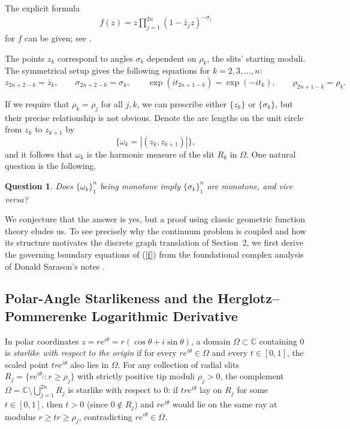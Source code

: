 \documentclass[11pt,reqno]{amsart}
\newtheorem{ques}[thm]{Question}
\numberwithin{equation}{section}
\newcommand{\C}{\mathbb{C}}
\begin{document}
The explicit formula
\begin{align} \label{f}
  f(z) = z \prod_{j=1}^{2n}(1-\bar{z}_jz)^{-\sigma_j}
\end{align}
for $f$ can be given; see \cite[Thm 3.18]{Pom}.

The points $z_k$ correspond to angles $\sigma_k$ dependent on $\rho_k$, the slits' starting moduli.
The symmetrical setup gives the following equations for $k = 2, 3, \dots, n$:
$$z_{2n+2-k} = \bar{z}_k, \qquad \sigma_{2n+2-k} = \sigma_k, \qquad \exp(it_{2n+1-k}) = \exp(-it_k), \qquad \rho_{2n+1-k} = \rho_k.$$

If we require that $\rho_k = \rho_j$ for all $j,k$, we can prescribe either $\{z_k\}$ or $\{\sigma_k\}$, but their precise relationship is not obvious. Denote the arc lengths on the unit circle from $z_k$ to $z_{k+1}$ by
$$\{\omega_k = |(z_k,z_{k+1})|\},$$
and it follows that $\omega_k$ is the harmonic measure of the slit $R_k$ in $\varOmega$.
One natural question is the following.
\begin{ques} \label{question}
Does $\{\omega_k\}_1^n$ being monotone imply $\{\sigma_k\}_1^n$ are monotone, and vice versa?
\end{ques}

We conjecture that the answer is yes, but a proof using classic geometric function theory eludes us. To see precisely why the continuum problem is coupled and how its structure motivates the discrete graph translation of Section~2, we first derive the governing boundary equations of (\ref{f}) from the foundational complex analysis of Donald Sarason's notes \cite{Sar}.

\subsection{Polar-Angle Starlikeness and the Herglotz--Pommerenke Logarithmic Derivative}

In polar coordinates $z = r e^{i\theta} = r(\cos\theta + i\sin\theta)$, a domain $\varOmega \subset \C$ containing $0$ is \emph{starlike with respect to the origin} if for every $r e^{i\theta} \in \varOmega$ and every $t \in [0, 1]$, the scaled point $t r e^{i\theta}$ also lies in $\varOmega$. For any collection of radial slits $R_j = \{r e^{i\theta_j} : r \ge \rho_j\}$ with strictly positive tip moduli $\rho_j > 0$, the complement $\varOmega = \C \setminus \bigcup_{j=1}^{2n} R_j$ is starlike with respect to $0$: if $t r e^{i\theta}$ lay on $R_j$ for some $t \in [0, 1]$, then $t > 0$ (since $0 \notin R_j$) and $r e^{i\theta}$ would lie on the same ray at modulus $r \ge t r \ge \rho_j$, contradicting $r e^{i\theta} \in \varOmega$.
\end{document}
